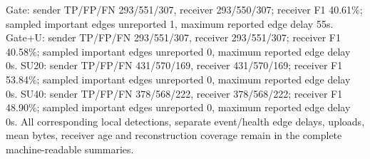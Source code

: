 Gate: sender TP/FP/FN 293/551/307, receiver 293/550/307; receiver F1 40.61\%; sampled important edges unreported 1, maximum reported edge delay 55s. Gate+U: sender TP/FP/FN 293/551/307, receiver 293/551/307; receiver F1 40.58\%; sampled important edges unreported 0, maximum reported edge delay 0s. SU20: sender TP/FP/FN 431/570/169, receiver 431/570/169; receiver F1 53.84\%; sampled important edges unreported 0, maximum reported edge delay 0s. SU40: sender TP/FP/FN 378/568/222, receiver 378/568/222; receiver F1 48.90\%; sampled important edges unreported 0, maximum reported edge delay 0s. All corresponding local detections, separate event/health edge delays, uploads, mean bytes, receiver age and reconstruction coverage remain in the complete machine-readable summaries.
